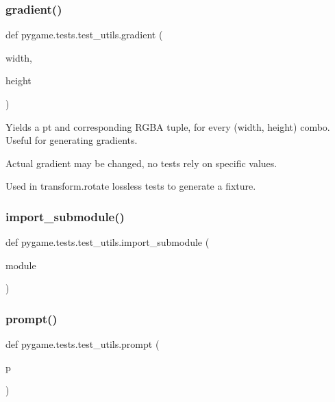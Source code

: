 \subsubsection{\texorpdfstring{gradient()}{gradient()}}
{\footnotesize\ttfamily def pygame.\+tests.\+test\+\_\+utils.\+gradient (\begin{DoxyParamCaption}\item[{}]{width,  }\item[{}]{height }\end{DoxyParamCaption})}

\begin{DoxyVerb}Yields a pt and corresponding RGBA tuple, for every (width, height) combo.
Useful for generating gradients.

Actual gradient may be changed, no tests rely on specific values.

Used in transform.rotate lossless tests to generate a fixture.\end{DoxyVerb}
 \mbox{\label{namespacepygame_1_1tests_1_1test__utils_a514fb747a30e17d1af7637103ec1109c}} 
\subsubsection{\texorpdfstring{import\+\_\+submodule()}{import\_submodule()}}
{\footnotesize\ttfamily def pygame.\+tests.\+test\+\_\+utils.\+import\+\_\+submodule (\begin{DoxyParamCaption}\item[{}]{module }\end{DoxyParamCaption})}

\mbox{\label{namespacepygame_1_1tests_1_1test__utils_ad1df3f1ab46016da74332e7059e8ec9d}} 
\subsubsection{\texorpdfstring{prompt()}{prompt()}}
{\footnotesize\ttfamily def pygame.\+tests.\+test\+\_\+utils.\+prompt (\begin{DoxyParamCaption}\item[{}]{p }\end{DoxyParamCaption})}

